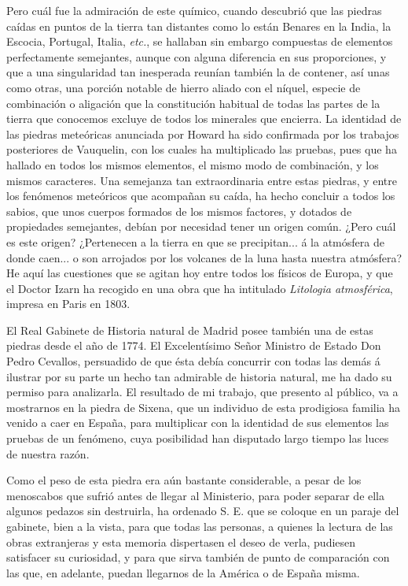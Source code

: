 \documentclass[a4paper, 12pt, oneside, spanish]{article}
\begin{document}
Pero cuál fue la admiración de este químico, cuando descubrió que las piedras caídas en puntos de la tierra tan distantes como lo están Benares en la India, la Escocia, Portugal, Italia, \emph{etc.}, se hallaban sin embargo compuestas de elementos perfectamente semejantes, aunque con alguna diferencia en sus proporciones, y que a una singularidad tan inesperada reunían también la de contener, así unas como otras, una porción notable de hierro aliado con el níquel, especie de combinación o aligación que la constitución habitual de todas las partes de la tierra que conocemos excluye de todos los minerales que encierra. La identidad de las piedras meteóricas anunciada por Howard ha sido confirmada por los trabajos posteriores de Vauquelin, con los cuales ha multiplicado las pruebas, pues que ha hallado en todos los mismos elementos, el mismo modo de combinación, y los mismos caracteres. Una semejanza tan extraordinaria entre estas piedras, y entre los fenómenos meteóricos que acompañan su caída, ha hecho concluir a todos los sabios, que unos cuerpos formados de los mismos factores, y dotados de propiedades semejantes, debían por necesidad tener un origen común. ¿Pero cuál es este origen? ¿Pertenecen a la tierra en que se precipitan... á la atmósfera de donde caen... o son arrojados por los volcanes de la luna hasta nuestra atmósfera? He aquí las cuestiones que se agitan hoy entre todos los físicos de Europa, y que el Doctor Izarn ha recogido en una obra que ha intitulado \emph{Litologia atmosférica}, impresa en Paris en 1803.

El Real Gabinete de Historia natural de Madrid posee también una de estas piedras desde el año de 1774. El Excelentísimo Señor Ministro de Estado Don Pedro Cevallos, persuadido de que ésta debía concurrir con todas las demás á ilustrar por su parte un hecho tan admirable de historia natural, me ha dado su permiso para analizarla. El resultado de mi trabajo, que presento al público, va a mostrarnos en la piedra de Sixena, que un individuo de esta prodigiosa familia ha venido a caer en España, para multiplicar con la identidad de sus elementos las pruebas de un fenómeno, cuya posibilidad han disputado largo tiempo las luces de nuestra razón.

Como el peso de esta piedra era aún bastante considerable, a pesar de los menoscabos que sufrió antes de llegar al Ministerio, para poder separar de ella algunos pedazos sin destruirla, ha ordenado S. E. que se coloque en un paraje del gabinete, bien a la vista, para que todas las personas, a quienes la lectura de las obras extranjeras y esta memoria dispertasen el deseo de verla, pudiesen satisfacer su curiosidad, y para que sirva también de punto de comparación con las que, en adelante, puedan llegarnos de la América o de España misma.
\end{document}
